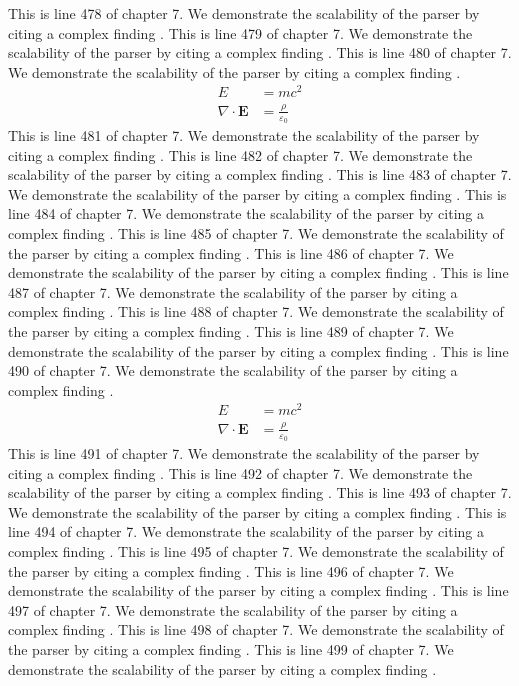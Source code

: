 This is line 478 of chapter 7. We demonstrate the scalability of the parser by citing a complex finding \cite{ref7_478}.
This is line 479 of chapter 7. We demonstrate the scalability of the parser by citing a complex finding \cite{ref7_479}.
This is line 480 of chapter 7. We demonstrate the scalability of the parser by citing a complex finding \cite{ref7_480}.
\begin{align*}
  E &= mc^2 \\
  \nabla \cdot \mathbf{E} &= \frac{\rho}{\varepsilon_0}
\end{align*}
This is line 481 of chapter 7. We demonstrate the scalability of the parser by citing a complex finding \cite{ref7_481}.
This is line 482 of chapter 7. We demonstrate the scalability of the parser by citing a complex finding \cite{ref7_482}.
This is line 483 of chapter 7. We demonstrate the scalability of the parser by citing a complex finding \cite{ref7_483}.
This is line 484 of chapter 7. We demonstrate the scalability of the parser by citing a complex finding \cite{ref7_484}.
This is line 485 of chapter 7. We demonstrate the scalability of the parser by citing a complex finding \cite{ref7_485}.
This is line 486 of chapter 7. We demonstrate the scalability of the parser by citing a complex finding \cite{ref7_486}.
This is line 487 of chapter 7. We demonstrate the scalability of the parser by citing a complex finding \cite{ref7_487}.
This is line 488 of chapter 7. We demonstrate the scalability of the parser by citing a complex finding \cite{ref7_488}.
This is line 489 of chapter 7. We demonstrate the scalability of the parser by citing a complex finding \cite{ref7_489}.
This is line 490 of chapter 7. We demonstrate the scalability of the parser by citing a complex finding \cite{ref7_490}.
\begin{align*}
  E &= mc^2 \\
  \nabla \cdot \mathbf{E} &= \frac{\rho}{\varepsilon_0}
\end{align*}
This is line 491 of chapter 7. We demonstrate the scalability of the parser by citing a complex finding \cite{ref7_491}.
This is line 492 of chapter 7. We demonstrate the scalability of the parser by citing a complex finding \cite{ref7_492}.
This is line 493 of chapter 7. We demonstrate the scalability of the parser by citing a complex finding \cite{ref7_493}.
This is line 494 of chapter 7. We demonstrate the scalability of the parser by citing a complex finding \cite{ref7_494}.
This is line 495 of chapter 7. We demonstrate the scalability of the parser by citing a complex finding \cite{ref7_495}.
This is line 496 of chapter 7. We demonstrate the scalability of the parser by citing a complex finding \cite{ref7_496}.
This is line 497 of chapter 7. We demonstrate the scalability of the parser by citing a complex finding \cite{ref7_497}.
This is line 498 of chapter 7. We demonstrate the scalability of the parser by citing a complex finding \cite{ref7_498}.
This is line 499 of chapter 7. We demonstrate the scalability of the parser by citing a complex finding \cite{ref7_499}.
